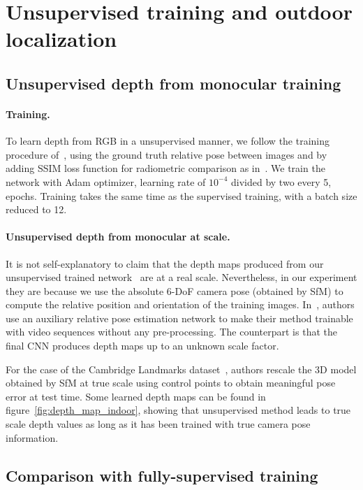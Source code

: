 \section{Unsupervised training and outdoor localization}
\label{subseq:outdoor}
\subsection{Unsupervised depth from monocular training}
\paragraph{Training.} To learn depth from RGB in a unsupervised manner, we follow the training procedure of~\citep{Zhou2017a}, using the ground truth relative pose between images and by adding SSIM loss function for radiometric comparison as in~\citep{Mahjourian2018}. We train the network with Adam optimizer, learning rate of $10^{-4}$ divided by two every 5, epochs. Training takes the same time as the supervised training, with a batch size reduced to 12.

\paragraph{Unsupervised depth from monocular at scale.} It is not self-explanatory to claim that the depth maps produced from our unsupervised trained network~\citep{Zhou2017a} are at a real scale. Nevertheless, in our experiment they are because we use the absolute 6-DoF camera pose (obtained by SfM) to compute the relative position and orientation of the training images. In~\citep{Zhou2017a}, authors use an auxiliary relative pose estimation network to make their method trainable with video sequences without any pre-processing. The counterpart is that the final CNN produces depth maps up to an unknown scale factor.

For the case of the Cambridge Landmarks dataset~\citep{Kendall2015}, authors rescale the 3D model obtained by SfM at true scale using control points to obtain meaningful pose error at test time. Some learned depth maps can be found in figure~\ref{fig:depth_map_indoor}, showing that unsupervised method leads to true scale depth values as long as it has been trained with true camera pose information.

\subsection{Comparison with fully-supervised training}



